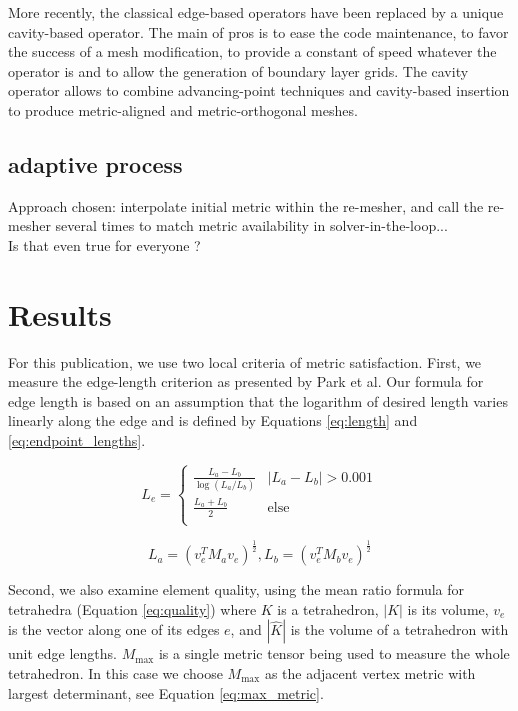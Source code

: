 \documentclass[3p,times,procedia,number]{elsarticle}
\begin{document}
More recently, the classical edge-based operators have been replaced by a unique cavity-based operator.\cite{loseille-menier-imr22-cavity,loseille-menier-alauzet-para-adapt}
The main of pros is to ease the code maintenance,
to favor the success of a mesh modification, to provide a constant of speed whatever the operator is and to allow the generation
of boundary layer grids.\cite{loseille-lohner-imr21-robust-bl-gen}
The cavity operator allows to combine advancing-point techniques
and cavity-based insertion to produce metric-aligned and metric-orthogonal meshes.\cite{loseille-imr-metric-ortho-aniso-gen}

{\color{blue}\subsection{adaptive process} 
Approach chosen: interpolate initial metric within the re-mesher, and call the re-mesher several times to match metric availability in solver-in-the-loop...\\
Is that even true for everyone ? }


\section{Results}
\label{sec:results}

For this publication, we use two local criteria of metric satisfaction.
First, we measure the edge-length criterion as presented
by Park et al.\cite{park-loseille-krakos-michal-adapt-decomposition}
Our formula for edge length is based on an assumption
that the logarithm of desired length varies linearly along the
edge\cite{alauzet-fead-2010-size-gradation-aniso} and is defined
by Equations \ref{eq:length} and \ref{eq:endpoint_lengths}.

\begin{equation}
\label{eq:length}
L_e = \begin{cases}
\frac{L_a - L_b}{\log(L_a / L_b)} & |L_a - L_b| > 0.001 \\
\frac{L_a + L_b}{2} & \text{else} \\
\end{cases}
\end{equation}

\begin{equation}
\label{eq:endpoint_lengths}
L_a = (v_e^T M_a v_e)^{\frac12},
L_b = (v_e^T M_b v_e)^{\frac12}
\end{equation}

Second, we also examine element quality, using the
mean ratio formula for tetrahedra (Equation \ref{eq:quality})
where $K$ is a tetrahedron, $|K|$ is its volume,
$v_e$ is the vector along one of its edges $e$,
and $|\hat{K}|$ is the volume of a tetrahedron
with unit edge lengths.
$M_{\text{max}}$ is a single metric tensor
being used to measure the whole tetrahedron.
In this case we choose $M_{\text{max}}$ as the
adjacent vertex metric with largest determinant,
see Equation \ref{eq:max_metric}.
\end{document}
